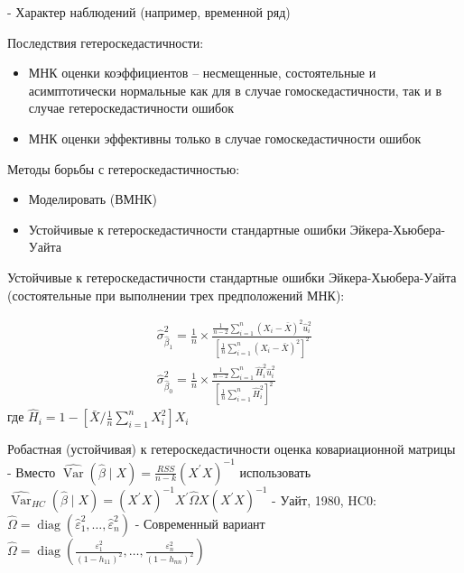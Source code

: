 \documentclass[a4paper,8pt]{article} %
\begin{document}
- Характер наблюдений (например, временной ряд)  

Последствия  гетероскедастичности:

\begin{itemize}
	\item МНК оценки коэффициентов – несмещенные,
	состоятельные и асимптотически нормальные как для в
	случае гомоскедастичности, так и в случае
	гетероскедастичности ошибок
	\item МНК оценки эффективны только в случае
	гомоскедастичности ошибок
\end{itemize}


Методы  борьбы  с гетероскедастичностью:

\begin{itemize}
	\item Моделировать (ВМНК)
	\item Устойчивые к гетероскедастичности стандартные
	ошибки Эйкера-Хьюбера-Уайта 
\end{itemize}


Устойчивые к гетероскедастичности стандартные
ошибки Эйкера-Хьюбера-Уайта (состоятельные при
выполнении трех предположений МНК):

$$
\begin{array}{l}
\hat{\sigma}_{\widehat{\beta}_{1}}^{2}=\frac{1}{n} \times \frac{\frac{1}{n-2} \sum_{i=1}^{n}\left(X_{i}-\bar{X}\right)^{2} \widehat{u}_{i}^{2}}{\left[\frac{1}{n} \sum_{i=1}^{n}\left(X_{i}-\bar{X}\right)^{2}\right]^{2}} \\
\hat{\sigma}_{\widehat{\beta}_{0}}^{2}=\frac{1}{n} \times \frac{\frac{1}{n-2} \sum_{i=1}^{n} \widehat{H}_{i}^{2} \hat{u}_{i}^{2}}{\left[\frac{1}{n} \sum_{i=1}^{n} \widehat{H}_{i}^{2}\right]^{2}}
\end{array}
$$
где $\widehat{H}_{i}=1-\left[\bar{X} / \frac{1}{n} \sum_{i=1}^{n} X_{i}^{2}\right] X_{i}$

Робастная (устойчивая) к гетероскедастичности оценка ковариационной матрицы
- Вместо $\widehat{\operatorname{Var}}(\hat{\beta} \mid X)=\frac{R S S}{n-k}\left(X^{\prime} X\right)^{-1}$
использовать $\widehat{\operatorname{Var}}_{H C}(\hat{\beta} \mid X)=\left(X^{\prime} X\right)^{-1} X^{\prime} \hat{\Omega} X\left(X^{\prime} X\right)^{-1}$
- Уайт, 1980, HC0: $\hat{\Omega}=\operatorname{diag}\left(\hat{\varepsilon}_{1}^{2}, \ldots, \hat{\varepsilon}_{n}^{2}\right)$
- Современный вариант $\hat{\Omega}=\operatorname{diag}\left(\frac{\varepsilon_{1}^{2}}{\left(1-h_{11}\right)^{2}}, \ldots, \frac{\varepsilon_{n}^{2}}{\left(1-h_{n n}\right)^{2}}\right)$
\end{document}
